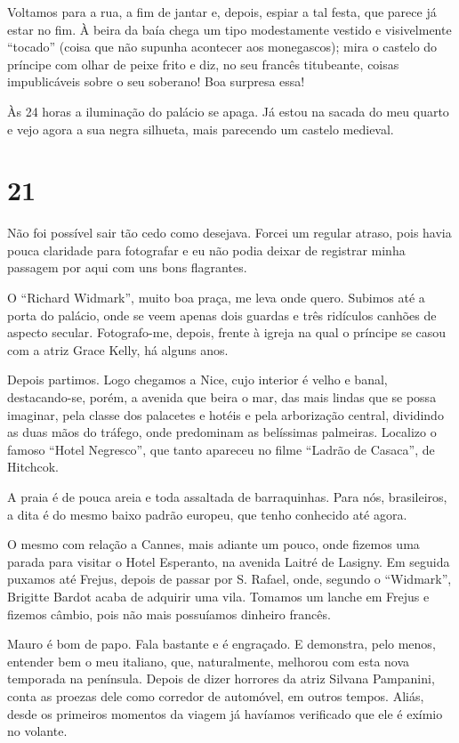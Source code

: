 Voltamos para a rua, a fim de jantar e, depois, espiar a tal festa, que parece já estar no fim. À beira da baía chega um tipo modestamente vestido e visivelmente ``tocado'' (coisa que não supunha acontecer aos monegascos); mira o castelo do príncipe com olhar de peixe frito e diz, no seu francês titubeante, coisas impublicáveis sobre o seu soberano! Boa surpresa essa!

Às 24 horas a iluminação do palácio se apaga. Já estou na sacada do meu quarto e vejo agora a sua negra silhueta, mais parecendo um castelo medieval.

\section*{21 \adfflatleafright {}}
Não foi possível sair tão cedo como desejava. Forcei um regular atraso, pois havia pouca claridade para fotografar e eu não podia deixar de registrar minha passagem por aqui com uns bons flagrantes.

O ``Richard Widmark'', muito boa praça, me leva onde quero. Subimos até a porta do palácio, onde se veem apenas dois guardas e três ridículos canhões de aspecto secular. Fotografo-me, depois, frente à igreja na qual o príncipe se casou com a atriz Grace Kelly, há alguns anos.

Depois partimos. Logo chegamos a Nice, cujo interior é velho e banal, destacando-se, porém, a avenida que beira o mar, das mais lindas que se possa imaginar, pela classe dos palacetes e hotéis e pela arborização central, dividindo as duas mãos do tráfego, onde predominam as belíssimas palmeiras. Localizo o famoso ``Hotel Negresco'', que tanto apareceu no filme ``Ladrão de Casaca'', de Hitchcok.

A praia é de pouca areia e toda assaltada de barraquinhas. Para nós, brasileiros, a dita é do mesmo baixo padrão europeu, que tenho conhecido até agora.

O mesmo com relação a Cannes, mais adiante um pouco, onde fizemos uma parada para visitar o Hotel Esperanto, na avenida Laitré de Lasigny. Em seguida puxamos até Frejus, depois de passar por S. Rafael, onde, segundo o ``Widmark'', Brigitte Bardot acaba de adquirir uma vila. Tomamos um lanche em Frejus e fizemos câmbio, pois não mais possuíamos dinheiro francês.

Mauro é bom de papo. Fala bastante e é engraçado. E demonstra, pelo menos, entender bem o meu italiano, que, naturalmente, melhorou com esta nova temporada na península. Depois de dizer horrores da atriz Silvana Pampanini, conta as proezas dele como corredor de automóvel, em outros tempos. Aliás, desde os primeiros momentos da viagem já havíamos verificado que ele é exímio no volante.

